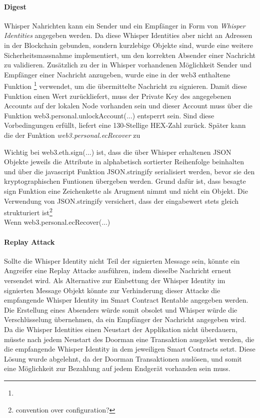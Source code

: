 \paragraph{Digest}
\label{para:Digest}
Whisper Nahrichten kann ein Sender und ein Empfänger in Form von \emph{Whisper Identities} angegeben werden. Da diese Whisper Identities aber nicht an Adressen in der Blockchain gebunden, sondern kurzlebige Objekte sind, wurde eine weitere Sicherheitsmassnahme implementiert, um den korrekten Absender einer Nachricht zu validieren.
Zusätzlich zu der in Whisper vorhandenen Möglichkeit Sender und Empfänger einer Nachricht anzugeben, wurde eine in der web3 enthaltene Funktion \footnote{} verwendet, um die übermittelte Nachricht zu signieren. Damit diese Funktion einen Wert zurückliefert, muss der Private Key des angegebenen Accounts auf der lokalen Node vorhanden sein und dieser Account muss über die Funktion web3.personal.unlockAccount(...) entsperrt sein. Sind diese Vorbedingungen erfüllt, liefert  eine 130-Stellige HEX-Zahl zurück. Später kann die  der Funktion \emph{web3.personal.ecRecover} zu

Wichtig bei web3.eth.sign(...) ist, dass die über Whisper erhaltenen JSON Objekte jeweils die Attribute in alphabetisch sortierter Reihenfolge beinhalten und über die javascript Funktion JSON.stringify serialisiert werden, bevor sie den kryptographischen Funtionen übergeben werden. Grund dafür ist, dass besagte sign Funktion eine Zeichenkette als Arugment nimmt und nicht ein Objekt. Die Verwendung von JSON.stringify versichert, dass der eingabewert stets gleich strukturiert ist\footnote{convention over configuration?}
\\Wenn web3.personal.ecRecover(...)

\paragraph{Replay Attack}
Sollte die Whisper Identity nicht Teil der signierten Message sein, könnte ein Angreifer eine Replay Attacke ausführen, indem dieselbe Nachricht erneut versendet wird. Als Alternative zur Einbettung der Whisper Identity im signierten Message Objekt könnte zur Verhinderung dieser Attacke die empfangende Whisper Identity im Smart Contract Rentable angegeben werden. Die Erstellung eines Absenders würde somit obsolet und Whisper würde die Verschlüsselung übernehmen, da ein Empfänger der Nachricht angegeben wird. Da die Whisper Identities einen Neustart der Applikation nicht überdauern, müsste nach jedem Neustart des Doorman eine Transaktion ausgelöst werden, die die empfangende Whisper Identity in dem jeweiligen Smart Contracts setzt. Diese Lösung wurde abgelehnt, da der Doorman Transaktionen auslösen, und somit eine Möglichkeit zur Bezahlung auf jedem Endgerät vorhanden sein muss.

